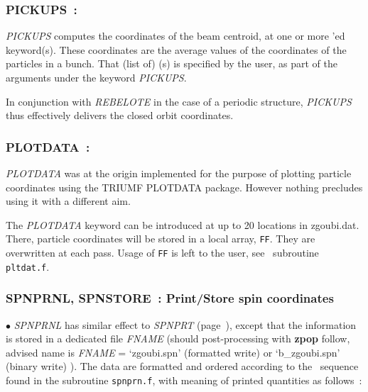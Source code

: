 \newpage

 
\subsubsection*{PICKUPS~: \PICKUPSTitl}\label{PICKUPS} 
\medskip

\noindent \textsl{PICKUPS} computes the coordinates of the beam centroid, 
at one or more \LABEL'ed keyword(s). 
 These coordinates are the average values of the coordinates of the  particles in a bunch. 
That (list of) \LABEL(s) is specified by the user, as part of the arguments under the keyword  \textsl{PICKUPS}.

\medskip
\noindent In conjunction with \textsl{REBELOTE} in the case of a periodic structure, 
  \textsl{PICKUPS} thus effectively delivers the closed orbit coordinates.        

\medskip






\newpage


\subsubsection*{PLOTDATA~: \PLOTDATATitl~\protect\cite{BiblioPlot}}%
\label{PLOTDATA} 

\medskip

\noindent  \textsl{PLOTDATA} was at the origin implemented for the purpose of plotting particle 
coordinates using the TRIUMF PLOTDATA package. However nothing precludes using it 
with a different aim. 

\medskip

\noindent  The \textsl{PLOTDATA} keyword can be introduced at up to 20 locations in zgoubi.dat.  There, particle coordinates 
will be stored in a local array, \texttt{FF}. They are overwritten at each pass. Usage of \texttt{FF} is left to the user, 
see \FORTRAN\ subroutine \texttt{pltdat.f}. 


\newpage

\subsubsection*{SPNPRNL, SPNSTORE~: Print/Store spin coordinates 
  }\label{SPNPRNL} \label{SPNSTORE}

\medskip 

\noindent  $\bullet$   \textsl{SPNPRNL} has similar effect to \textsl{SPNPRT} (page~\pageref{SPNPRT}), 
except that the information is
stored in a  dedicated file \textsl{FNAME} (should post-processing with \textbf{zpop} follow, 
advised name is \textsl{FNAME} = `zgoubi.spn' (formatted write) or `b\_zgoubi.spn' (binary write) ). 
The data are formatted and ordered according to the  \FORTRAN\ sequence found in the subroutine \texttt{spnprn.f}, 
with meaning of printed quantities as follows~: 

